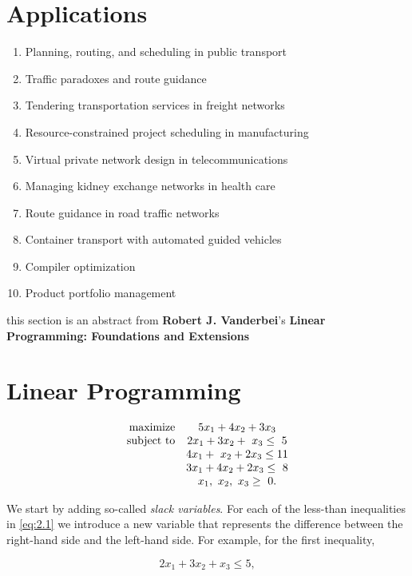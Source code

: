\documentclass{article}
\begin{document}
\section*{Applications}
\begin{enumerate}
    \item Planning, routing, and scheduling in public transport
    \item Traffic paradoxes and route guidance
    \item Tendering transportation services in freight networks
    \item Resource-constrained project scheduling in manufacturing
    \item Virtual private network design in telecommunications
    \item Managing kidney exchange networks in health care
    \item Route guidance in road traffic networks
    \item Container transport with automated guided vehicles
    \item Compiler optimization
    \item Product portfolio management
\end{enumerate}
\newpage
\normalsize
\pagestyle{otherpages}
this section is an abstract from \textbf{Robert J. Vanderbei}'s \textbf{Linear Programming: Foundations and Extensions}
\section{Linear Programming}
\begin{equation}\label{eq:2.1}
    \begin{array}[]{rcl}
    \text{maximize} & 5x_{1}+4x_{2}+3x_{3} \\
    \text{subject to} & 2x_{1}+3x_{2}+\ x_{3}\leq\ 5 \\
    & 4x_{1}+\ x_{2}+2x_{3}\leq 11 \\
    & 3x_{1}+4x_{2}+2x_{3}\leq\ 8 \\
    & x_{1},\ x_{2},\ x_{3}\geq\ 0.
    \end{array}
    \end{equation}
    
    We start by adding so-called \emph{slack variables}. For each of the less-than inequalities in \eqref{eq:2.1} we introduce a new variable that represents the difference between the right-hand side and the left-hand side. For example, for the first inequality,
    
    \[ 2x_{1}+3x_{2}+x_{3}\leq 5, \]
    
\end{document}
